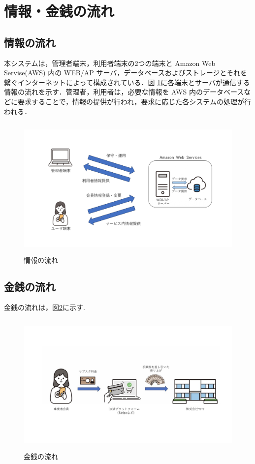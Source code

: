 \section{情報・金銭の流れ}
\subsection{情報の流れ}

本システムは，管理者端末，利用者端末の2つの端末と Amazon Web Servise(AWS) 内の WEB/AP サーバ，データベースおよびストレージとそれを繋ぐインターネットによって構成されている．図 \ref{fig:Q8}に各端末とサーバが通信する情報の流れを示す．管理者，利用者は，必要な情報を AWS 内のデータベースなどに要求することで，情報の提供が行われ，要求に応じた各システムの処理が行われる．


\begin{figure}[H]
        \centering
        \includegraphics[width=12cm, height=7cm]{sections/pictures/4-1_info.jpg}
        \caption{情報の流れ}

        \label{fig:Q8}

\end{figure}



\subsection{金銭の流れ}

金銭の流れは，図\ref{fig:Q9}に示す.


\begin{figure}[H]
        \centering
        \includegraphics[width=12cm, height=7cm]{sections/pictures/4-2_money_new.jpg}
        \caption{金銭の流れ}

        \label{fig:Q9}

\end{figure}

